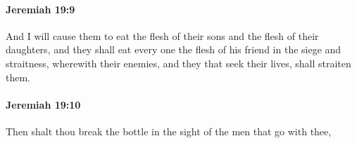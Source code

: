		\paragraph{Jeremiah 19:9} %
			\label{JEREMIAH-19-9}

			And I will cause them to eat the flesh of their sons and the flesh of their daughters, and they shall eat every one the flesh of his friend in the siege and straitness, wherewith their enemies, and they that seek their lives, shall straiten them.


		\paragraph{Jeremiah 19:10} %
			\label{JEREMIAH-19-10}

			Then shalt thou break the bottle in the sight of the men that go with thee,


